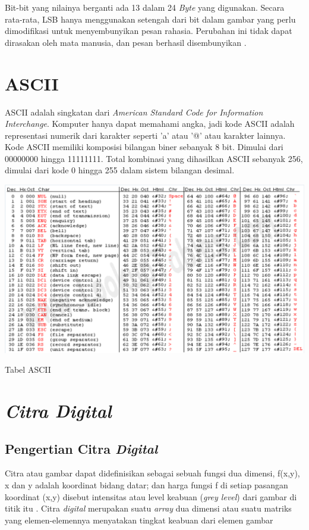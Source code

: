 Bit-bit yang nilainya berganti ada 13 dalam 24 \emph{Byte} yang digunakan. Secara rata-rata, LSB hanya menggunakan setengah dari bit dalam gambar yang perlu dimodifikasi untuk menyembunyikan pesan rahasia. Perubahan ini tidak dapat dirasakan oleh mata manusia, dan pesan berhasil disembunyikan \cite{elgabar2}.

\section{ASCII}
ASCII adalah singkatan dari \emph{American Standard Code for Information Interchange}. Komputer hanya dapat memahami angka, jadi kode ASCII adalah representasi numerik dari karakter seperti 'a' atau '@' atau karakter lainnya. Kode ASCII memiliki komposisi bilangan biner sebanyak 8 bit. Dimulai dari 00000000 hingga 11111111. Total kombinasi yang dihasilkan ASCII sebanyak 256, dimulai dari kode 0 hingga 255 dalam sistem bilangan desimal. \cite{ascii}
\begin{table}[H]
	\centering
	\includegraphics[width=1.0\textwidth]{gambar/table_ascii}
	\caption{Tabel ASCII}
	\label{tabel_ascii}
\end{table}

\section{\emph{Citra Digital}}
	\subsection{Pengertian Citra \emph{Digital}}
	Citra atau gambar dapat didefinisikan sebagai sebuah fungsi dua dimensi, f(x,y), x dan y adalah koordinat bidang datar; dan harga fungsi f di setiap pasangan koordinat (x,y) disebut intensitas atau level keabuan (\emph{grey level}) dari gambar di titik itu \cite{hermawati}. Citra \emph{digital} merupakan suatu \emph{array} dua dimensi atau suatu matriks yang elemen-elemennya menyatakan tingkat keabuan dari elemen gambar \cite{arymurthy} 
	
